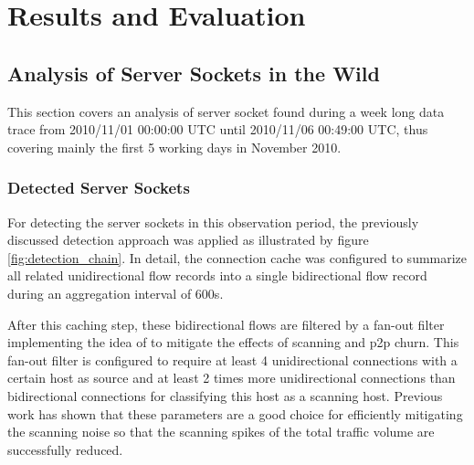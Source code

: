 \chapter{Results and Evaluation 
\label{chapter:results}}


\section{Analysis of Server Sockets in the Wild}

This section covers an analysis of \gls{server socket} found during a week long data trace from 2010/11/01 00:00:00 UTC until 2010/11/06 00:49:00 UTC, thus covering mainly the first 5 working days in November 2010.

\subsection{Detected Server Sockets}

For detecting the \glspl{server socket} in this observation period, the previously discussed detection approach was applied as illustrated by figure \ref{fig:detection_chain}.
In detail, the connection cache was configured to summarize all related unidirectional flow records into a single bidirectional flow record during an aggregation interval of 600s.

After this caching step, these bidirectional flows are filtered by a fan-out filter implementing the idea of \citet{Allman:2007} to mitigate the effects of scanning and \gls{p2p} churn. 
This fan-out filter is configured to require at least 4 unidirectional connections with a certain host as source and at least 2 times more unidirectional connections than bidirectional connections for classifying this host as a scanning host.
Previous work\citep{Schatzmann:Mining,Schatzmann:Dissection, Schatzmann:Tracing} has shown that these parameters are a good choice for efficiently mitigating the scanning noise so that the scanning spikes of the total traffic volume are successfully reduced.

